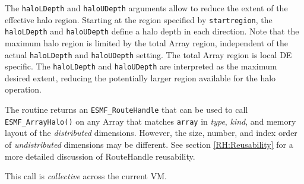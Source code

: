      The {\tt haloLDepth} and {\tt haloUDepth} arguments allow to reduce
     the extent of the effective halo region. Starting at the region specified
     by {\tt startregion}, the {\tt haloLDepth} and {\tt haloUDepth}
     define a halo depth in each direction. Note that the maximum halo region is
     limited by the total Array region, independent of the actual
     {\tt haloLDepth} and {\tt haloUDepth} setting. The total Array region is
     local DE specific. The {\tt haloLDepth} and {\tt haloUDepth} are interpreted
     as the maximum desired extent, reducing the potentially larger region
     available for the halo operation.
  
     The routine returns an {\tt ESMF\_RouteHandle} that can be used to call 
     {\tt ESMF\_ArrayHalo()} on any Array that matches 
     {\tt array} in {\em type}, {\em kind}, and 
     memory layout of the {\em distributed} dimensions. However, the size,
     number, and index order of {\em undistributed} dimensions may be different.
     See section \ref{RH:Reusability} for a more detailed discussion of
     RouteHandle reusability.
  
     This call is {\em collective} across the current VM.  
  
